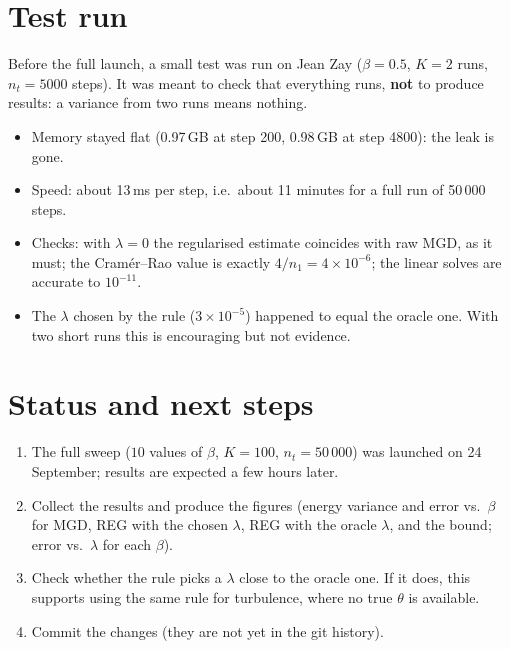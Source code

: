 \documentclass[11pt,a4paper]{article}
\begin{document}
\section{Test run}
Before the full launch, a small test was run on Jean Zay ($\beta = 0.5$, $K = 2$ runs,
$n_t = 5000$ steps). It was meant to check that everything runs, \textbf{not} to produce results:
a variance from two runs means nothing.
\begin{itemize}
  \item Memory stayed flat (0.97\,GB at step 200, 0.98\,GB at step 4800): the leak is gone.
  \item Speed: about 13\,ms per step, i.e.\ about 11 minutes for a full run of 50\,000 steps.
  \item Checks: with $\lambda = 0$ the regularised estimate coincides with raw MGD, as it must;
        the Cram\'er--Rao value is exactly $4/n_1 = 4\times10^{-6}$; the linear solves are
        accurate to $10^{-11}$.
  \item The $\lambda$ chosen by the rule ($3\times10^{-5}$) happened to equal the oracle one.
        With two short runs this is encouraging but not evidence.
\end{itemize}

\section{Status and next steps}
\begin{enumerate}
  \item The full sweep ($10$ values of $\beta$, $K = 100$, $n_t = 50\,000$) was launched on
        24 September; results are expected a few hours later.
  \item Collect the results and produce the figures (energy variance and error vs.\ $\beta$ for
        MGD, REG with the chosen $\lambda$, REG with the oracle $\lambda$, and the bound; error vs.\
        $\lambda$ for each $\beta$).
  \item Check whether the rule picks a $\lambda$ close to the oracle one. If it does, this
        supports using the same rule for turbulence, where no true $\theta$ is available.
  \item Commit the changes (they are not yet in the git history).
\end{enumerate}

\appendix
\end{document}
